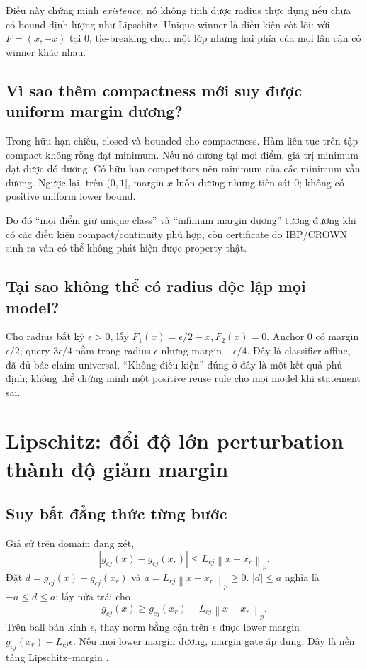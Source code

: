 \documentclass[11pt,a4paper]{article}
\newcommand{\norm}[1]{\left\lVert#1\right\rVert}
\theoremstyle{definition}
\begin{document}
Điều này chứng minh \emph{existence}; nó không tính được radius thực dụng
nếu chưa có bound định lượng như Lipschitz. Unique winner là điều kiện
cốt lõi: với $F=(x,-x)$ tại 0, tie-breaking chọn một lớp nhưng hai phía
của mọi lân cận có winner khác nhau.

\subsection{Vì sao thêm compactness mới suy được uniform margin dương?}
Trong hữu hạn chiều, closed và bounded cho compactness. Hàm liên tục trên
tập compact không rỗng đạt minimum. Nếu nó dương tại mọi điểm, giá trị
minimum đạt được đó dương. Có hữu hạn competitors nên minimum của các
minimum vẫn dương. Ngược lại, trên $(0,1]$, margin $x$ luôn dương nhưng
tiến sát 0; không có positive uniform lower bound.

Do đó ``mọi điểm giữ unique class'' và ``infimum margin dương'' tương
đương khi có các điều kiện compact/continuity phù hợp, còn certificate do
IBP/CROWN sinh ra vẫn có thể không phát hiện được property thật.

\subsection{Tại sao không thể có radius độc lập mọi model?}
Cho radius bất kỳ $\epsilon>0$, lấy $F_1(x)=\epsilon/2-x,F_2(x)=0$.
Anchor 0 có margin $\epsilon/2$; query $3\epsilon/4$ nằm trong radius
$\epsilon$ nhưng margin $-\epsilon/4$. Đây là classifier affine, đã đủ bác
claim universal. ``Không điều kiện'' đúng ở đây là một kết quả phủ định;
không thể chứng minh một positive reuse rule cho mọi model khi statement sai.

\section{Lipschitz: đổi độ lớn perturbation thành độ giảm margin}
\subsection{Suy bất đẳng thức từng bước}
Giả sử trên domain đang xét,
\begin{equation}
|g_{cj}(x)-g_{cj}(x_r)|\le L_{cj}\norm{x-x_r}_p.
\end{equation}
Đặt $d=g_{cj}(x)-g_{cj}(x_r)$ và $a=L_{cj}\norm{x-x_r}_p\ge0$.
$|d|\le a$ nghĩa là $-a\le d\le a$; lấy nửa trái cho
\begin{equation}
g_{cj}(x)\ge g_{cj}(x_r)-L_{cj}\norm{x-x_r}_p.
\end{equation}
Trên ball bán kính $\epsilon$, thay norm bằng cận trên $\epsilon$ được
lower margin $g_{cj}(x_r)-L_{cj}\epsilon$. Nếu mọi lower margin dương,
margin gate áp dụng. Đây là nền tảng Lipschitz--margin \cite{lmt}.
\end{document}
